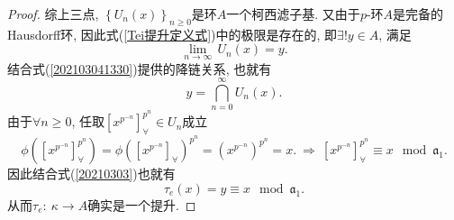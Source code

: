 \documentclass[UTF8, twoside]{ctexart}
\theoremstyle{nonumberplain}
\newtheorem{proof}{\heiti 证明}  %
\theoremstyle{nonumberplain}
\theoremstyle{plain}
\begin{document}
\begin{proof}
		综上三点, ${{\left\{ {{U}_{n}}\left( x \right) \right\}}_{n\ge 0}}$是环$A$一个柯西滤子基. 又由于$p$-环$A$是完备的Hausdorff环, 因此式(\ref{Tei提升定义式})中的极限是存在的, 
		即$\exists !y\in A$, 满足
		\[
			\underset{n\to \infty }{\mathop{\lim }}\,{{U}_{n}}\left( x \right)=y.
		\]
		结合式(\ref{202103041330})提供的降链关系, 也就有
		\begin{equation} \label{20210303}
			y=\bigcap\limits_{n=0}^{\infty }{{{U}_{n}}\left( x \right)}.
		\end{equation}
		由于$\forall n\ge 0$, 任取$\left[ {{x}^{{{p}^{-n}}}} \right]_{\forall }^{{{p}^{n}}}\in {{U}_{n}}$成立
		\[
		\phi \left( \left[ {{x}^{{{p}^{-n}}}} \right]_{\forall }^{{{p}^{n}}} \right)=\phi {{\left( {{\left[ {{x}^{{{p}^{-n}}}} \right]}_{\forall }} \right)}^{{{p}^{n}}}}={{\left( {{x}^{{{p}^{-n}}}} \right)}^{{{p}^{n}}}}=x.
		\ \Longrightarrow \ 
		\left[ {{x}^{{{p}^{-n}}}} \right]_{\forall }^{{{p}^{n}}}\equiv x\ \bmod {{\mathfrak{a}}_{1}}.	
		\]
		因此结合式(\ref{20210303})也就有
		\[
			{{\tau }_{e}}\left( x \right)=y\equiv x\ \bmod {{\mathfrak{a}}_{1}}.
		\]
		从而${{\tau }_{e}}:\ \kappa \to A$确实是一个提升.
	\end{proof}
	\vskip 0.5cm
	
\end{document}
